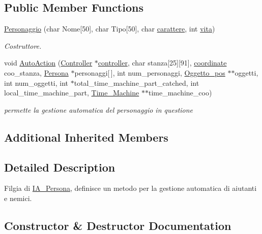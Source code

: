 \subsection*{Public Member Functions}
\begin{DoxyCompactItemize}
\item 
\hyperlink{classPersonaggio_ac7577ef8db7274dcb71d91e4572784d2}{Personaggio} (char Nome\mbox{[}50\mbox{]}, char Tipo\mbox{[}50\mbox{]}, char \hyperlink{classPersona_a1fff44e46be477b79413387307b0aaff}{carattere}, int \hyperlink{classPersona_a1e784d3a56cddd6ba8e81387df1efc7b}{vita})
\begin{DoxyCompactList}\small\item\em Costruttore. \end{DoxyCompactList}\item 
void \hyperlink{classPersonaggio_adc6035b95bffaec15a0c879bbc773af6}{Auto\+Action} (\hyperlink{structController}{Controller} $\ast$\hyperlink{structcontroller}{controller}, char stanza\mbox{[}25\mbox{]}\mbox{[}91\mbox{]}, \hyperlink{structcoordinate}{coordinate} coo\+\_\+stanza, \hyperlink{classPersona}{Persona} $\ast$personaggi\mbox{[}$\,$\mbox{]}, int num\+\_\+personaggi, \hyperlink{structOggetto__pos}{Oggetto\+\_\+pos} $\ast$$\ast$oggetti, int num\+\_\+oggetti, int $\ast$total\+\_\+time\+\_\+machine\+\_\+part\+\_\+catched, int local\+\_\+time\+\_\+machine\+\_\+part, \hyperlink{structTime__Machine}{Time\+\_\+\+Machine} $\ast$$\ast$time\+\_\+machine\+\_\+coo)
\begin{DoxyCompactList}\small\item\em permette la gestione automatica del personaggio in questione \end{DoxyCompactList}\end{DoxyCompactItemize}
\subsection*{Additional Inherited Members}


\subsection{Detailed Description}
Filgia di \hyperlink{classIA__Persona}{I\+A\+\_\+\+Persona}, definisce un metodo per la gestione automatica di aiutanti e nemici. 

\subsection{Constructor \& Destructor Documentation}
\hypertarget{classPersonaggio_ac7577ef8db7274dcb71d91e4572784d2}{}
